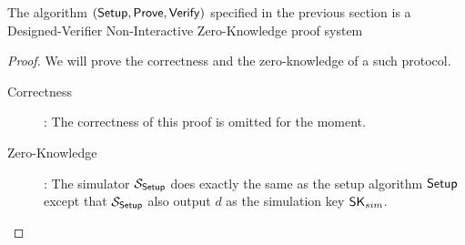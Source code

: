 \begin{theorem}
  The algorithm $({\mathsf{Setup}}, {\mathsf{Prove}}, {\mathsf{Verify}})$ specified in the previous section is a Designed-Verifier Non-Interactive Zero-Knowledge proof system
\end{theorem}

\begin{proof}
  We will prove the correctness and the zero-knowledge of a such protocol.
  \begin{description}
  \item[\textsf{Correctness}]: The correctness of this proof is omitted for the moment.
  \item[\textsf{Zero-Knowledge}]:
    The simulator $\mathcal{S}_{{\mathsf{Setup}}}$ does exactly the same as the setup algorithm ${\mathsf{Setup}}$ except that $\mathcal{S}_{{\mathsf{Setup}}}$ also output $d$ as the simulation key $\mathsf{SK}_{sim}$.


\end{description}
\end{proof}
